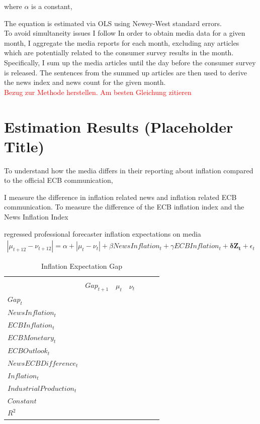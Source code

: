 \documentclass[review]{elsarticle}
\begin{document}
where $\alpha$ is a constant, 


The equation is estimated via OLS using Newey-West standard errors.
\\
To avoid simultaneity issues I follow \cite{LamlaLein2014} In order to obtain media data for a given month, I aggregate the media reports for each month, excluding any articles which are potentially related to the consumer survey results in the month. Specifically, I sum up the media articles until the day before the consumer survey is released. The sentences from the summed up articles are then used to derive the news index and news count for the given month.
\\
\textcolor{red}{Bezug zur Methode herstellen. Am besten Gleichung zitieren}
\\

\section{Estimation Results (Placeholder Title)}\label{sec:Estimation Results}

To understand how the media differs in their reporting about inflation compared to the official ECB communication, 

I measure the difference in inflation related news and inflation related ECB communication. 
To measure the difference of the ECB inflation index and the News Inflation Index 

\cite{LamlaLein2014} regressed professional forecaster inflation expectations on media 
\begin{align}
|\mu_{t+12} - \nu_{t+12}| = \alpha + |\mu_t - \nu_t| + \beta NewsInflation_t + \gamma ECBInflation_t + \mathbf{\delta} \mathbf{Z_t} + \epsilon_t
\end{align}

\begin{table}
\centering 
  \caption{Inflation Expectation Gap} 
  \label{tab:Inflation Expectation Gap}
\begin{tabular}{lcccccc}   
\\[-1.8ex]\hline
\hline \\[-1.8ex] 
& $Gap_{t+1}$ & $\mu_t$ & $\nu_t$ & & &\\ 
$Gap_t$ & & & & & &\\
$NewsInflation_t$ & & & & & & \\
$ECBInflation_t$ & & & & & &\\
$ECBMonetary_t$ & & & & & &\\
$ECBOutlook_t$ & & & & & &\\
$News ECB Difference_t$ & & & & & &\\
$Inflation_t$ & & & & & &\\
$IndustrialProduction_t$ & & & & & &\\
$Constant$ & & & & & &\\
\midrule
	$R^2$ & & & & & &\\
\bottomrule
 \end{tabular} 
\end{table}
\end{document}
